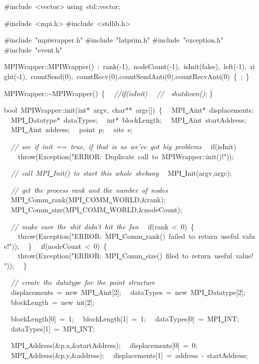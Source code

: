 {\ttfamily \raggedright \footnotesize
\#include\ <{}vector>{}
using\ std::vector;

\#include\ <{}mpi.h>{}
\#include\ <{}stdlib.h>{}

\#include\ "{}mpiwrapper.h"{}
\#include\ "{}latprim.h"{}
\#include\ "{}exception.h"{}
\#include\ "{}event.h"{}

MPIWrapper::MPIWrapper()\ :\ rank(-{}1),\ nodeCount(-{}1),\ isInit(false),\ left(-{}1),\ right(-{}1),\ countSend(0),\ countRecv(0),countSendAnti(0),countRecvAnti(0)\ \{\ ;\ \}

MPIWrapper::\textasciitilde MPIWrapper()\ \{
\ \ \textsl{//if(isInit)}
\ \ \textsl{//\ \ shutdown();}
\}

bool\ MPIWrapper::init(int*\ argv,\ char**\ argc[])\ \{
\ \ MPI\underline\ Aint*\ displacements;
\ \ MPI\underline\ Datatype*\ dataTypes;
\ \ int*\ blockLength;
\ \ MPI\underline\ Aint\ startAddress;
\ \ MPI\underline\ Aint\ address;
\ \ point\ p;
\ \ site\ s;

\ \ \textsl{//\ see\ if\ init\ ==\ true,\ if\ that\ is\ so\ we've\ got\ big\ problems}
\ \ if(isInit)
\ \ \ \ throw(Exception("{}ERROR:\ Duplicate\ call\ to\ MPIWrapper::init()!"{}));

\ \ \textsl{//\ call\ MPI\underline\ Init()\ to\ start\ this\ whole\ shebang}
\ \ MPI\underline\ Init(argv,argc);

\ \ \textsl{//\ get\ the\ process\ rank\ and\ the\ number\ of\ nodes}
\ \ MPI\underline\ Comm\underline\ rank(MPI\underline\ COMM\underline\ WORLD,\&rank);
\ \ MPI\underline\ Comm\underline\ size(MPI\underline\ COMM\underline\ WORLD,\&nodeCount);

\ \ \textsl{//\ make\ sure\ the\ shit\ didn't\ hit\ the\ fan}
\ \ if(rank\ <{}\ 0)\ \{
\ \ \ \ throw(Exception("{}ERROR:\ MPI\underline\ Comm\underline\ rank()\ failed\ to\ return\ useful\ value!"{}));
\ \ \}
\ \ if(nodeCount\ <{}\ 0)\ \{
\ \ \ \ throw(Exception("{}ERROR:\ MPI\underline\ Comm\underline\ size()\ filed\ to\ return\ useful\ value!"{}));
\ \ \}

\ \ \textsl{//\ create\ the\ datatype\ for\ the\ point\ structure}
\ \ displacements\ =\ new\ MPI\underline\ Aint[2];
\ \ dataTypes\ =\ new\ MPI\underline\ Datatype[2];
\ \ blockLength\ =\ new\ int[2];

\ \ blockLength[0]\ =\ 1;
\ \ blockLength[1]\ =\ 1;
\ \ dataTypes[0]\ =\ MPI\underline\ INT;
\ \ dataTypes[1]\ =\ MPI\underline\ INT;

\ \ MPI\underline\ Address(\&p.x,\&startAddress);
\ \ displacements[0]\ =\ 0;
\ \ MPI\underline\ Address(\&p.y,\&address);
\ \ displacements[1]\ =\ address\ -{}\ startAddress;

}
